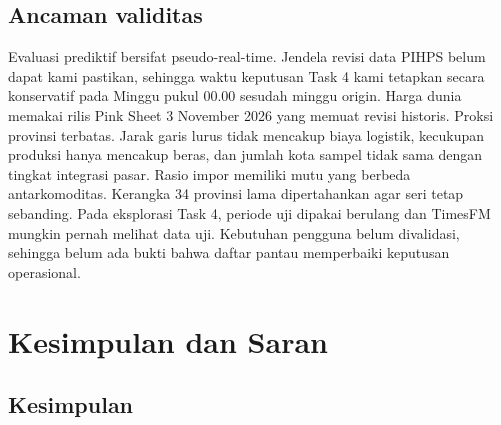 \documentclass[11pt,a4paper]{article}
\begin{document}
\subsection{Ancaman validitas}

Evaluasi prediktif bersifat pseudo-real-time. Jendela revisi data PIHPS belum dapat kami pastikan, sehingga waktu keputusan Task 4
kami tetapkan secara konservatif pada Minggu pukul 00.00 sesudah minggu origin. Harga dunia memakai rilis Pink Sheet 3 November 2026
yang memuat revisi historis. Proksi provinsi terbatas. Jarak garis lurus tidak mencakup biaya logistik, kecukupan produksi hanya
mencakup beras, dan jumlah kota sampel tidak sama dengan tingkat integrasi pasar. Rasio impor memiliki mutu yang berbeda
antarkomoditas. Kerangka 34 provinsi lama dipertahankan agar seri tetap sebanding. Pada eksplorasi Task 4, periode uji dipakai
berulang dan TimesFM mungkin pernah melihat data uji. Kebutuhan pengguna belum divalidasi, sehingga belum ada bukti bahwa daftar
pantau memperbaiki keputusan operasional.

\section{Kesimpulan dan Saran}

\subsection{Kesimpulan}
\end{document}
